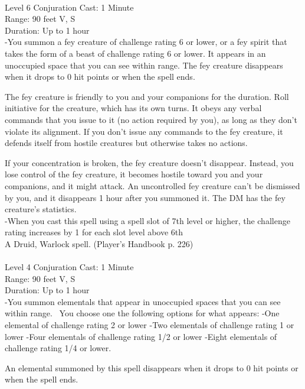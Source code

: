 \documentclass[10pt,twocolumn]{report}
\begin{document}
 \\
Level 6 \quad Conjuration \quad Cast: 1 Minute\\
Range: 90 feet \quad V, S\\
Duration: Up to 1 hour \quad \\
-You summon a fey creature of challenge rating 6 or lower, or a fey spirit that takes the form of a beast of challenge rating 6 or lower. 
It appears in an unoccupied space that you can see within range. The fey creature disappears when it drops to 0 hit points or when the spell ends. 

The fey creature is friendly to you and your companions for the duration. Roll initiative for the creature, which has its own turns. It obeys any verbal commands that you issue to it (no action required by you), as long as they don’t violate its alignment. If you don’t issue any commands to the fey creature, it defends itself from hostile creatures but otherwise takes no actions. 

If your concentration is broken, the fey creature doesn’t disappear. Instead, you lose control of the fey creature, it becomes hostile toward you and your companions, and it might attack. An uncontrolled fey creature can’t be dismissed by you, and it disappears 1 hour after you summoned it. 
The DM has the fey creature’s statistics.\\
-When you cast this spell using a spell slot of 7th level or higher, the challenge rating increases by 1 for each slot level above 6th\\
A Druid, Warlock spell. (Player's Handbook p. 226) \\


 \\
Level 4 \quad Conjuration \quad Cast: 1 Minute\\
Range: 90 feet \quad V, S\\
Duration: Up to 1 hour \quad \\
-You summon elementals that appear in unoccupied spaces that you can see within range.
 You choose one the following options for what appears: 
-One elemental of challenge rating 2 or lower 
-Two elementals of challenge rating 1 or lower 
-Four elementals of challenge rating 1/2 or lower 
-Eight elementals of challenge rating 1/4 or lower. 

An elemental summoned by this spell disappears when it drops to 0 hit points or when the spell ends. 
\end{document}
